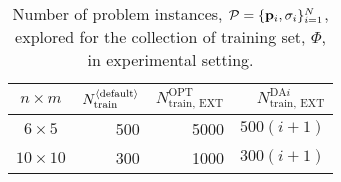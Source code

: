 \begin{table}[t]
\centering
\begin{tabular}{crrr} \toprule
$n \times m$  & $N_{\text{train}}^{\langle \text{default} \rangle}$ 
                     & $N_{\text{train, EXT}}^{\text{OPT}}$ 
                              & $N_{\text{train, EXT}}^{\text{DA}i}$ \\ \midrule
$6\times 5$   & 500  & 5000   & $500(i+1)$ \\
$10\times 10$ & 300  & 1000   & $300(i+1)$ \\
\bottomrule
\end{tabular}
\caption{Number of problem instances, 
$\mathcal{P}=\{\mathbf{p}_i,{\mathbf{\sigma}}_i\}_{i=1}^{N}$, explored for the collection of 
training set, $\Phi$, in experimental setting.}
\label{tbl:Ntrain}
\end{table}
